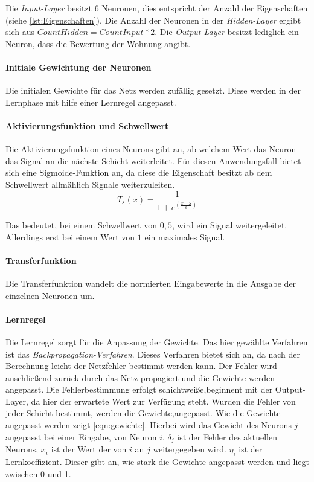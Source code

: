Die \textit{Input-Layer} besitzt $6$ Neuronen, dies entspricht der 
Anzahl der Eigenschaften (siehe \autoref{lst:Eigenschaften}). 
Die Anzahl der Neuronen in der \textit{Hidden-Layer} ergibt sich aus 
$CountHidden = CountInput * 2$. Die \textit{Output-Layer} besitzt
lediglich ein Neuron, dass die Bewertung der Wohnung angibt. 

\paragraph{Initiale Gewichtung der Neuronen}
Die initialen Gewichte für das Netz werden zufällig gesetzt. Diese werden in der Lernphase 
mit hilfe einer Lernregel angepasst.

\paragraph{Aktivierungsfunktion und Schwellwert}
Die Aktivierungsfunktion eines Neurons gibt an, ab welchem Wert das Neuron das 
Signal an die nächste Schicht weiterleitet. 
Für diesen Anwendungsfall bietet sich eine Sigmoide-Funktion an, 
da diese die Eigenschaft besitzt ab dem Schwellwert allmählich 
Signale weiterzuleiten.\\

\begin{equation}
    T_s(x) = \frac{1}{1+e^(\frac{x-S}{k})}
\end{equation}

Das bedeutet, bei einem Schwellwert von $0,5$, wird ein Signal weitergeleitet. 
Allerdings erst bei einem Wert von $1$ ein maximales Signal. 
 

\paragraph{Transferfunktion}
Die Transferfunktion wandelt die normierten Eingabewerte in die Ausgabe der einzelnen Neuronen um.

\paragraph{Lernregel}
Die Lernregel sorgt für die Anpassung der Gewichte. Das hier gewählte 
Verfahren ist das \textit{Backpropagation-Verfahren}. 
Dieses Verfahren bietet sich an, da nach der Berechnung leicht der Netzfehler bestimmt werden kann. 
Der Fehler wird anschließend zurück durch das Netz propagiert und die Gewichte
werden angepasst. Die Fehlerbestimmung erfolgt schichtweiße,beginnent mit der Output-Layer, 
da hier der erwartete Wert zur Verfügung steht. Wurden die Fehler von jeder 
Schicht bestimmt, werden die Gewichte,angepasst. 
Wie die Gewichte angepasst werden zeigt \autoref{eqn:gewichte}. 
Hierbei wird das Gewicht des Neurons $j$ angepasst bei einer Eingabe, 
von Neuron $i$.
$\delta_j$ ist der Fehler des aktuellen Neurons, $x_i$ ist der Wert der von $i$ an $j$ weitergegeben wird.
$\eta_i$ ist der Lernkoeffizient. 
Dieser gibt an, wie stark die Gewichte angepasst werden und liegt zwischen 0 und 1.

